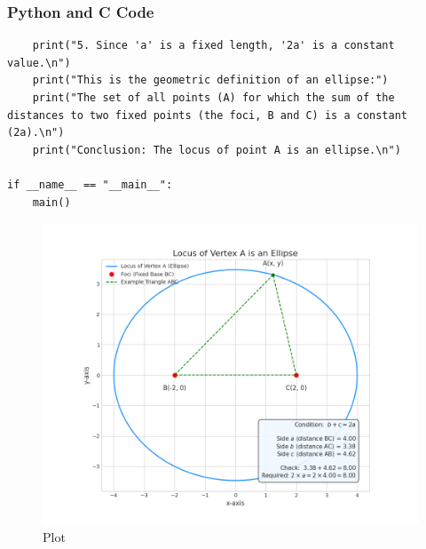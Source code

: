 \documentclass{beamer}
\begin{document}
\begin{frame}[fragile]
\frametitle{Python and C Code}
\begin{lstlisting}
    print("5. Since 'a' is a fixed length, '2a' is a constant value.\n")
    print("This is the geometric definition of an ellipse:")
    print("The set of all points (A) for which the sum of the distances to two fixed points (the foci, B and C) is a constant (2a).\n")
    print("Conclusion: The locus of point A is an ellipse.\n")

if __name__ == "__main__":
    main()
\end{lstlisting}
\end{frame}
\begin{frame}
\begin{figure}
    \centering
    \includegraphics[width=0.75\columnwidth]{graph15.png}
    \caption{Plot}
    \label{fig:placeholder}
\end{figure}
\end{frame}
\end{document}
